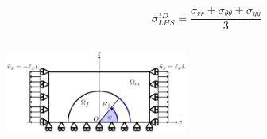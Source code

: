 \documentclass[first,firstsupp,lastsupp,last,hyperref,table]{ETHclass}
\begin{document}
\begin{frame}
\begin{columns}[c]
\begin{column}{0.5\textwidth}
\begin{figure}
\end{figure}
\vspace{-0.5cm}
\scriptsize
\begin{equation*}
\sigma^{3D}_{LHS}=\frac{\sigma_{rr}+\sigma_{\theta\theta}+\sigma_{yy}}{3}
\end{equation*}
\end{column}
\end{columns}
\vspace{-0.3cm}
\includegraphics[width=0.45\textwidth]{refAngle.pdf}
\end{frame}

\addtocounter{framenumber}{-1}
\end{document}
